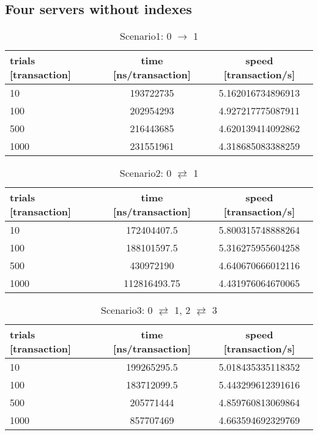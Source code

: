\documentclass[a4j,11pt,uplatex,onecolumn]{article}
\begin{document}
\subsection{Four servers without indexes}
\begin{table}[htb]
  \begin{center}
    \caption{Scenario1: 0 $\rightarrow$ 1}
    \begin{tabular}{|l|c|c|} \hline
        trials [transaction] & time [ns/transaction] & speed [transaction/s]\\ \hline \hline
        10 & 193722735 & 5.162016734896913\\
        100 & 202954293 & 4.927217775087911\\
        500 & 216443685 & 4.620139414092862\\
        1000 & 231551961 & 4.318685083388259\\ \hline
    \end{tabular}
  \end{center}
\end{table}

\begin{table}[htb]
  \begin{center}
    \caption{Scenario2: 0 $\rightleftarrows$ 1}
    \begin{tabular}{|l|c|c|} \hline
        trials [transaction] & time [ns/transaction] & speed [transaction/s]\\ \hline \hline
        10 & 172404407.5 & 5.800315748888264\\
        100 & 188101597.5 & 5.316275955604258\\
        500 & 430972190 & 4.640670666012116\\
        1000 & 112816493.75 & 4.431976064670065\\ \hline
    \end{tabular}
  \end{center}
\end{table}

\begin{table}[htb]
  \begin{center}
    \caption{Scenario3: 0 $\rightleftarrows$ 1, 2 $\rightleftarrows$ 3}
    \begin{tabular}{|l|c|c|} \hline
        trials [transaction] & time [ns/transaction] & speed [transaction/s]\\ \hline \hline
        10 & 199265295.5 & 5.018435335118352\\
        100 & 183712099.5 & 5.443299612391616\\
        500 & 205771444 & 4.859760813069864\\
        1000 & 857707469 & 4.663594692329769\\ \hline
    \end{tabular}
  \end{center}
\end{table}
\end{document}
